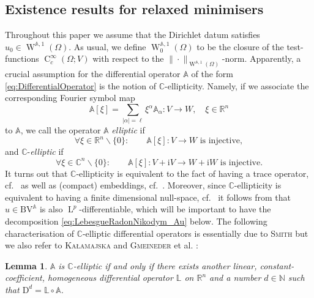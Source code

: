 \documentclass[a4paper,10pt,reqno,oneside]{amsart}
\numberwithin{equation}{section}
\newcommand{\R}{\mathbb R}
\newcommand{\C}{\mathbb C}
\newcommand{\N}{\mathbb N}
\newcommand{\Aop}{\mathbb{A}}
\newcommand{\lebe}{\operatorname{L}}
\newcommand{\sobo}{\operatorname{W}}
\newcommand{\hold}{\operatorname{C}}
\newcommand{\BV}{\mathrm{BV}}
\newcommand{\D}{\mathrm{D}}
\newcommand{\abs}[1]{\left\lvert#1\right\rvert}
\newtheorem{lem}[thm]{Lemma}
\begin{document}
\subsection{Existence results for relaxed minimisers} Throughout this paper we assume that the Dirichlet datum satisfies $u_0\in\sobo^{\Aop,1}(\Omega)$. As usual, we define $\sobo^{\Aop,1}_0(\Omega)$ to be the closure of the test-functions $\hold^\infty_c(\Omega;V)$ with respect to the $\|\cdot\|_{\sobo^{\Aop,1}(\Omega)}$-norm. Apparently, a crucial assumption for the differential operator $\Aop$ of the form \eqref{eq:DifferentialOperator} is the notion of $\C$-ellipticity. Namely, if we associate the corresponding Fourier symbol map
\begin{equation*}
	\Aop[\xi]=\sum_{\abs{\alpha}=\ell}\xi^\alpha\Aop_\alpha: V\to W, \quad \xi\in\R^n
\end{equation*}
to $\Aop$, we call the operator $\Aop$ \emph{elliptic} if
\begin{equation*}
	\forall \xi\in\R^n\backslash\{0\}:\qquad \Aop[\xi]:V\to W \text{ is injective},
\end{equation*}
and $\C$-\emph{elliptic} if
\begin{equation*}
	\forall \xi\in\C^n\backslash\{0\}:\qquad \Aop[\xi]:V+\mathrm{i}V\to W+\mathrm{i}W \text{ is injective}.
\end{equation*}
It turns out that $\C$-ellipticity is equivalent to the fact of having a trace operator, cf.~\cite{BDG} as well as (compact) embeddings, cf.~\cite{GmRa1}. Moreover, since $\C$-ellipticity is equivalent to having a finite dimensional null-space, cf.~\cite[Thm. 2.6]{BDG} it follows from \cite{GmRa2,Raita} that $u\in\BV^\Aop$ is also $\lebe^p$-differentiable, which will be important to have the decomposition \eqref{eq:LebesgueRadonNikodym_Au} below. The following characterisation of $\C$-elliptic differential operators is essentially due to \textsc{Smith} \cite{Smith} but we also refer to \textsc{Ka\l{}amajska} \cite{Kalamajska} and \textsc{Gmeineder} et al. \cite[Prop. 3.2]{GRV}:
\begin{lem}\label{lem:Cellipt}
	$\Aop$ is $\C$-elliptic if and only if there exists another linear, constant-coefficient, homogeneous differential operator $\mathbb{L}$ on $\R^n$ and a number $d\in\N$ such that $\D^d=\mathbb{L}\circ\Aop$.
\end{lem}
\end{document}

